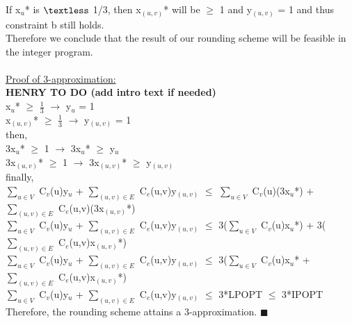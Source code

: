 \documentclass[10pt]{csc_assignment}
\begin{document}
\begin{description}
\begin{flushleft}
If x$_{u}$* is $\textless$ 1/3, then x$_{(u, v)}$* will be  $\geqslant$ 1 and y$_{(u,v)}$ = 1 and thus constraint b still holds. \\
Therefore we conclude that the result of our rounding scheme will be feasible in the integer program.\\
~\\
\underline{Proof of 3-approximation:}\\
\textbf{HENRY TO DO (add intro text if needed)}\\
x$_{u}$* $\geqslant$ $\frac{1}{3}$ $\rightarrow$ y$_{u}$ = 1\\
x$_{(u, v)}$* $\geqslant$ $\frac{1}{3}$ $\rightarrow$ y$_{(u, v)}$ = 1\\
then,\\
3x$_{u}$* $\geqslant$ 1 $\rightarrow$ 3x$_{u}$* $\geqslant$ y$_{u}$\\
3x$_{(u, v)}$* $\geqslant$ 1 $\rightarrow$ 3x$_{(u, v)}$* $\geqslant$ y$_{(u, v)}$\\
finally,\\
$\sum_{u \in V}$ C$_{v}$(u)y$_{u}$ + $\sum_{(u, v) \in E}$ C$_{e}$(u,v)y$_{(u, v)}$ $\leqslant$
$\sum_{u \in V}$ C$_{v}$(u)(3x$_{u}$*) + $\sum_{(u, v) \in E}$ C$_{e}$(u,v)(3x$_{(u, v)}$*)\\
$\sum_{u \in V}$ C$_{v}$(u)y$_{u}$ + $\sum_{(u, v) \in E}$ C$_{e}$(u,v)y$_{(u, v)}$ $\leqslant$
3($\sum_{u \in V}$ C$_{v}$(u)x$_{u}$*) + 3($\sum_{(u, v) \in E}$ C$_{e}$(u,v)x$_{(u, v)}$*)\\
$\sum_{u \in V}$ C$_{v}$(u)y$_{u}$ + $\sum_{(u, v) \in E}$ C$_{e}$(u,v)y$_{(u, v)}$ $\leqslant$
3($\sum_{u \in V}$ C$_{v}$(u)x$_{u}$* + $\sum_{(u, v) \in E}$ C$_{e}$(u,v)x$_{(u, v)}$*)\\
$\sum_{u \in V}$ C$_{v}$(u)y$_{u}$ + $\sum_{(u, v) \in E}$ C$_{e}$(u,v)y$_{(u, v)}$ $\leqslant$ 3*LPOPT $\leqslant$ 3*IPOPT\\
Therefore, the rounding scheme attains a 3-approximation. $\blacksquare$\\
\end{flushleft}
\end{description}
\end{document}
